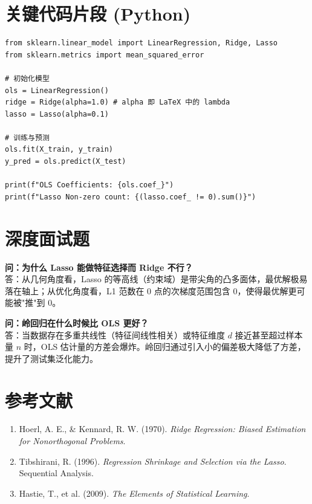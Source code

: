 \documentclass[12pt, a4paper]{article}
\begin{document}
\section{关键代码片段 (Python)}
\begin{lstlisting}
from sklearn.linear_model import LinearRegression, Ridge, Lasso
from sklearn.metrics import mean_squared_error

# 初始化模型
ols = LinearRegression()
ridge = Ridge(alpha=1.0) # alpha 即 LaTeX 中的 lambda
lasso = Lasso(alpha=0.1)

# 训练与预测
ols.fit(X_train, y_train)
y_pred = ols.predict(X_test)

print(f"OLS Coefficients: {ols.coef_}")
print(f"Lasso Non-zero count: {(lasso.coef_ != 0).sum()}")
\end{lstlisting}

\section{深度面试题}

\textbf{问：为什么 Lasso 能做特征选择而 Ridge 不行？}\\
答：从几何角度看，Lasso 的等高线（约束域）是带尖角的凸多面体，最优解极易落在轴上；从优化角度看，L1 范数在 0 点的次梯度范围包含 0，使得最优解更可能被"推"到 0。

\textbf{问：岭回归在什么时候比 OLS 更好？}\\
答：当数据存在多重共线性（特征间线性相关）或特征维度 $d$ 接近甚至超过样本量 $n$ 时，OLS 估计量的方差会爆炸。岭回归通过引入小的偏差极大降低了方差，提升了测试集泛化能力。

\section{参考文献}
\begin{enumerate}
    \item Hoerl, A. E., \& Kennard, R. W. (1970). \textit{Ridge Regression: Biased Estimation for Nonorthogonal Problems}.
    \item Tibshirani, R. (1996). \textit{Regression Shrinkage and Selection via the Lasso}. Sequential Analysis.
    \item Hastie, T., et al. (2009). \textit{The Elements of Statistical Learning}.
\end{enumerate}
\end{document}
